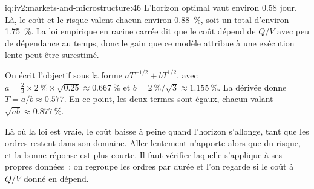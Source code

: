 \begin{solution}{iq:iv2:markets-and-microstructure:46}
L'horizon optimal vaut environ 0.58 jour. Là, le coût et le risque valent chacun environ 0.88~\%, soit un total d'environ 1.75~\%. La loi empirique en racine carrée dit que le coût dépend de $Q/V$ avec peu de dépendance au temps, donc le gain que ce modèle attribue à une exécution lente peut être surestimé.

On écrit l'objectif sous la forme $aT^{-1/2} + bT^{1/2}$, avec $a = \tfrac23 \times 2~\% \times \sqrt{0.25} \approx 0.667~\%$ et $b = 2~\%/\sqrt 3 \approx 1.155~\%$. La dérivée donne $T = a/b \approx 0.577$. En ce point, les deux termes sont égaux, chacun valant $\sqrt{ab} \approx 0.877~\%$.

Là où la loi est vraie, le coût baisse à peine quand l'horizon s'allonge, tant que les ordres restent dans son domaine. Aller lentement n'apporte alors que du risque, et la bonne réponse est plus courte. Il faut vérifier laquelle s'applique à ses propres données~: on regroupe les ordres par durée et l'on regarde si le coût à $Q/V$ donné en dépend.

\end{solution}


